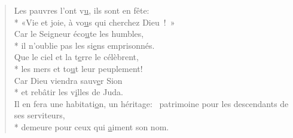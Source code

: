\begin{verse}
Les pauvres l’ont v\underline{u}, ils sont en fête: \\*
«Vie et joie, à vo\underline{u}s qui cherchez Dieu ! » \\
Car le Seigneur éco\underline{u}te les humbles, \\*
il n’oublie pas les si\underline{e}ns emprisonnés. \\
Que le ciel et la t\underline{e}rre le célèbrent, \\*
les mers et to\underline{u}t leur peuplement! \\

Car Dieu viendra sauv\underline{e}r Sion \\*
et rebâtir les v\underline{i}lles de Juda. \\
Il en fera une habitati\underline{o}n, un héritage:~\psalmstar
{}patrimoine pour les descendants de ses serviteurs, \\*
demeure pour ceux qui \underline{a}iment son nom. \\
\end{verse}

